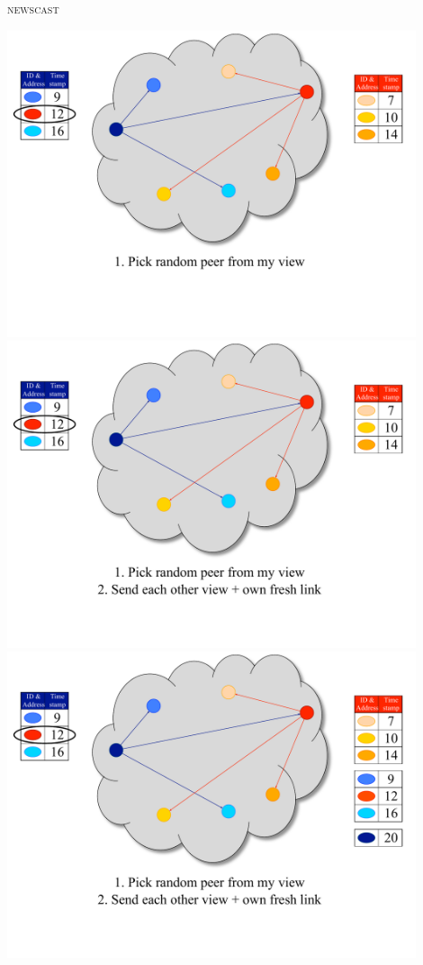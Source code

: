 \begin{frame}{\textsc{newscast}}
\begin{overprint}
\includegraphics[width=0.9\textwidth]{4_newscast}
\includegraphics[width=0.9\textwidth]{5_newscast}
\includegraphics[width=0.9\textwidth]{6_newscast}

\end{overprint}
\end{frame}
